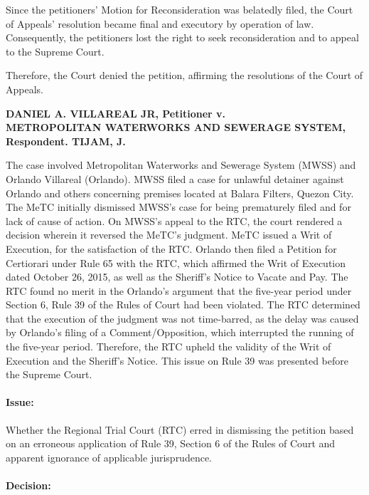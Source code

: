 \documentclass[
12pt,
oneside,
onehalfspacing,
headsepline
]{DigestCollection}
\begin{document}
Since the petitioners' Motion for Reconsideration was belatedly filed, the Court of Appeals' resolution became final and executory by operation of law. Consequently, the petitioners lost the right to seek reconsideration and to appeal to the Supreme Court.

Therefore, the Court denied the petition, affirming the resolutions of the Court of Appeals.

\label{94987c90-1236-11ef-aa24-9916ea601717}


\noindent\textbf{DANIEL A. VILLAREAL JR, Petitioner v. \\METROPOLITAN WATERWORKS AND SEWERAGE SYSTEM, Respondent. TIJAM, J.}\vspace{0.4cm}

The case involved Metropolitan Waterworks and Sewerage System (MWSS) and Orlando Villareal (Orlando). MWSS filed a case for unlawful detainer against Orlando and others concerning premises located at Balara Filters, Quezon City. The MeTC initially dismissed MWSS's case for being prematurely filed and for lack of cause of action. On MWSS's appeal to the RTC, the court rendered a decision wherein it reversed the MeTC's judgment. MeTC issued a Writ of Execution, for the satisfaction of the RTC. Orlando then filed a Petition for Certiorari under Rule 65 with the RTC, which affirmed the Writ of Execution dated October 26, 2015, as well as the Sheriff's Notice to Vacate and Pay. The RTC found no merit in the Orlando's argument that the five-year period under Section 6, Rule 39 of the Rules of Court had been violated. The RTC determined that the execution of the judgment was not time-barred, as the delay was caused by Orlando's filing of a Comment/Opposition, which interrupted the running of the five-year period. Therefore, the RTC upheld the validity of the Writ of Execution and the Sheriff's Notice. This issue on Rule 39 was presented before the Supreme Court.

\paragraph{Issue:}
\label{9d655c40-123f-11ef-aa24-9916ea601717}


Whether the Regional Trial Court (RTC) erred in dismissing the petition based on an erroneous application of Rule 39, Section 6 of the Rules of Court and apparent ignorance of applicable jurisprudence.

\paragraph{Decision:}
\label{9ab9eb50-123f-11ef-aa24-9916ea601717}
\end{document}
